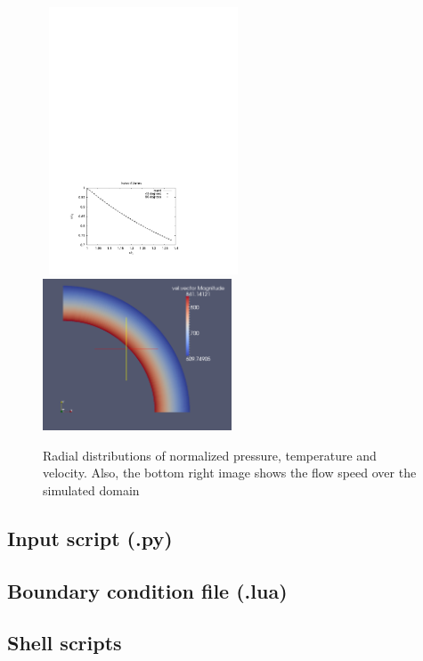 \begin{figure}[htbp]
\begin{center}
{}
\mbox{
\includegraphics[width=0.5\textwidth,viewport=66 60 408 292,clip=true]{../2D/vortex/radial_profile_u.pdf}
\includegraphics[width=0.5\textwidth]{../2D/vortex/vtx-speed-field.png}
}
\end{center}
\caption{Radial distributions of normalized pressure, temperature and velocity. 
  Also, the bottom right image shows the flow speed over the simulated domain}
\label{vortex-radial-fig}
\end{figure}


\newpage
\subsection{Input script (.py)}
\topbar

\bottombar

\subsection{Boundary condition file (.lua)}
\topbar

\bottombar

\subsection{Shell scripts}
\label{vortex-sh-files}
\topbar

\bottombar


